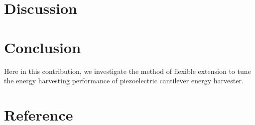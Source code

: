 \documentclass{elsarticle}
\begin{document}
\section{Discussion}



\section{Conclusion}

Here in this contribution, we investigate the method of flexible extension to tune the energy harvesting performance of piezoelectric cantilever energy harvester.


\section*{Reference}



\end{document}
